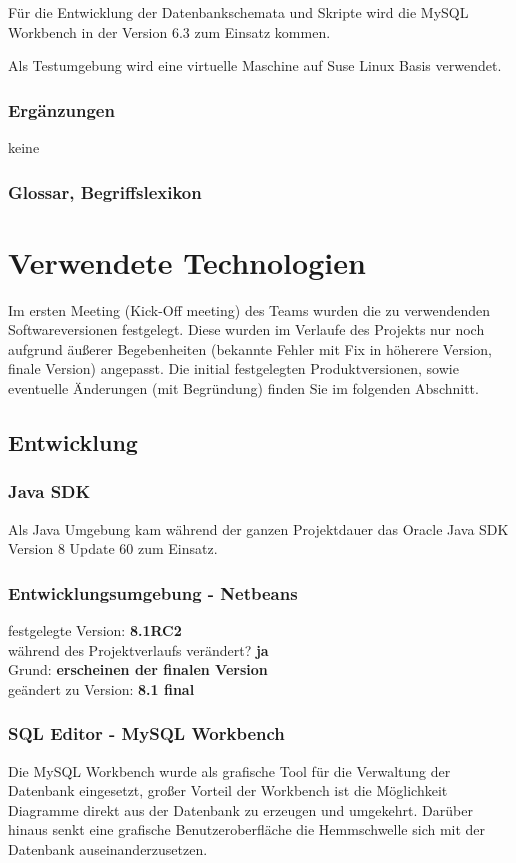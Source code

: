 \documentclass[12pt,a4paper,parskip]{scrreprt}
\begin{document}
Für die Entwicklung der Datenbankschemata und Skripte wird die MySQL Workbench in der Version 6.3 zum Einsatz kommen.

Als Testumgebung wird eine virtuelle Maschine auf Suse Linux Basis verwendet.
\subsection{Ergänzungen}
keine
\subsection{Glossar, Begriffslexikon}
\chapter{Verwendete Technologien}
Im ersten Meeting (Kick-Off meeting) des Teams wurden die zu verwendenden Softwareversionen festgelegt. Diese wurden im Verlaufe des Projekts nur noch aufgrund äußerer Begebenheiten (bekannte Fehler mit Fix in höherere Version, finale Version) angepasst. Die initial festgelegten Produktversionen, sowie eventuelle Änderungen (mit Begründung) finden Sie im folgenden Abschnitt.
\section{Entwicklung}
\subsection{Java SDK}
Als Java Umgebung kam während der ganzen Projektdauer das Oracle Java SDK Version 8 Update 60 zum Einsatz.
\subsection{Entwicklungsumgebung - Netbeans}
festgelegte Version: \textbf{8.1RC2}\\
während des Projektverlaufs verändert? \textbf{ja}\\
Grund: \textbf{erscheinen der finalen Version} \\
geändert zu Version: \textbf{8.1 final}\\

\subsection{SQL Editor - MySQL Workbench}
Die MySQL Workbench wurde als grafische Tool für die Verwaltung der Datenbank eingesetzt, großer Vorteil der Workbench ist die Möglichkeit Diagramme direkt aus der Datenbank zu erzeugen und umgekehrt. Darüber hinaus senkt eine grafische Benutzeroberfläche die Hemmschwelle sich mit der Datenbank auseinanderzusetzen.
\end{document}

